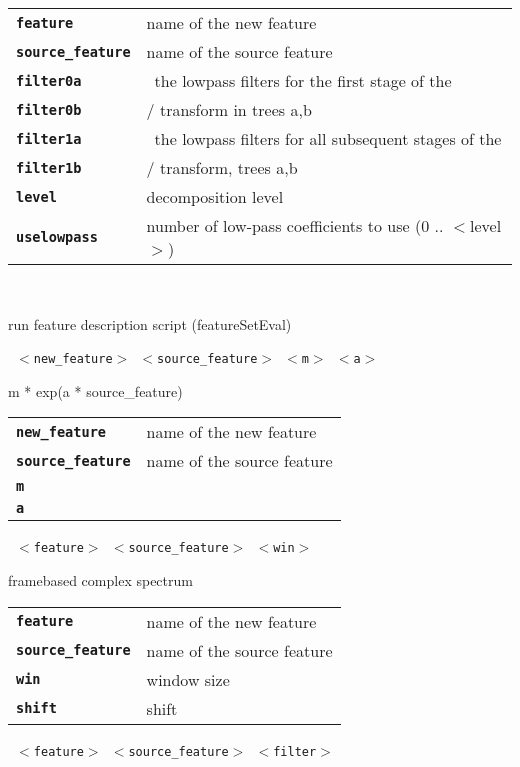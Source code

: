\begin{description}
\begin{description}
      \begin{tabular}{ll}
 \texttt{\textbf{feature}} &         name of the new feature \\
 \texttt{\textbf{source\_feature}} &  name of the source feature \\
 \texttt{\textbf{filter0a}} &        \ the lowpass filters for the first stage of the \\
 \texttt{\textbf{filter0b}} &        / transform in trees a,b \\
 \texttt{\textbf{filter1a}} &        \ the lowpass filters for all subsequent stages of the \\
 \texttt{\textbf{filter1b}} &        / transform, trees a,b \\
 \texttt{\textbf{level}} &           decomposition level  \\
 \texttt{\textbf{uselowpass}} &       number of low-pass coefficients to use (0 .. $<$level$>$)  \\
      \end{tabular}
       \texttt{} \

        run feature description script (featureSetEval)

       \texttt{ $<$new\_feature$>$ $<$source\_feature$>$ $<$m$>$ $<$a$>$} \

        m * exp(a * source\_feature)

      \begin{tabular}{ll}
 \texttt{\textbf{new\_feature}} &     name of the new feature \\
 \texttt{\textbf{source\_feature}} &  name of the source feature \\
 \texttt{\textbf{m}} &                 \\
 \texttt{\textbf{a}} &                 \\
      \end{tabular}
       \texttt{ $<$feature$>$ $<$source\_feature$>$ $<$win$>$ } \

        framebased complex spectrum

      \begin{tabular}{ll}
 \texttt{\textbf{feature}} &         name of the new feature \\
 \texttt{\textbf{source\_feature}} &  name of the source feature \\
 \texttt{\textbf{win}} &             window size  \\
 \texttt{\textbf{shift}} &            shift  \\
      \end{tabular}
       \texttt{ $<$feature$>$ $<$source\_feature$>$ $<$filter$>$ } \


\end{description}
\end{description}
